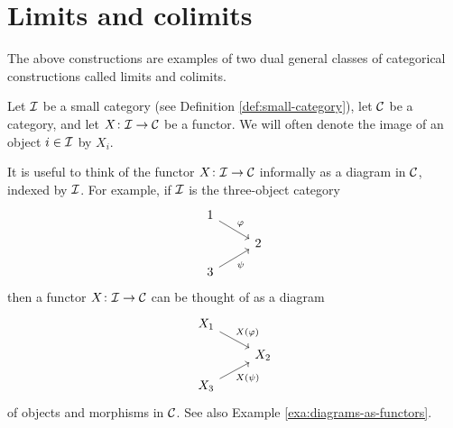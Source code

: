 \documentclass[11pt]{amsbook}
\DeclareMathOperator\Mod{{\bf{Mod}}}
\DeclareMathOperator\coker{coker}
\def\Set{\mathbf{Set}}
\def\Mod{\mathbf{Mod}}
\theoremstyle{plain}
\theoremstyle{definition}
\newtheorem{example}[theorem]{Example}
\begin{document}
%
%
%
%
\section{Limits and colimits}

The above constructions are examples of two dual general classes of categorical constructions called limits and colimits.

Let ${\mathcal{I}}$ be a small category (see Definition \ref{def:small-category}), let ${\mathcal{C}}$ be a category, and let $X\colon {\mathcal{I}} \to {\mathcal{C}}$ be a functor. We will often denote the image of an object $i \in {\mathcal{I}}$ by $X_i$.

It is useful to think of the functor $X\colon {\mathcal{I}}\to {\mathcal{C}}$ informally as a diagram in ${\mathcal{C}}$, indexed by ${\mathcal{I}}$. For example, if ${\mathcal{I}}$ is the three-object category
\[
\begin{tikzcd}[row sep=small]
1 \arrow{rd}{\varphi}  \\ & 2 \\ 3 \arrow[swap]{ru}{\psi}
\end{tikzcd}
\]
then a functor $X\colon {\mathcal{I}}\to {\mathcal{C}}$ can be thought of as  a diagram
\[
\begin{tikzcd}[row sep=small]
X_1 \arrow{rd}{\!X(\varphi)}  \\ & X_2 \\ X_3 \arrow[swap]{ru}{\!X(\psi)}
\end{tikzcd}
\]
of objects and morphisms in ${\mathcal{C}}$. See also Example \ref{exa:diagrams-as-functors}.
\end{document}
